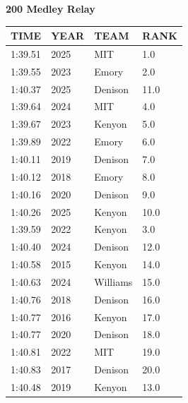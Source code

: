 \begin{table}[H]
\centering
\begin{minipage}[t]{0.6\textwidth}
\centering
\textbf{200 Medley Relay}\\[0.1cm]
\begin{tabular}{@{}p{1.8cm}p{1.2cm}p{1.4cm}p{0.8cm}@{}}
\hline
    \textbf{TIME} & \textbf{YEAR} & \textbf{TEAM} & \textbf{RANK} \\
\hline
    1:39.51 & 2025 & MIT & 1.0 \\
    1:39.55 & 2023 & Emory & 2.0 \\
    1:40.37 & 2025 & Denison & 11.0 \\
    1:39.64 & 2024 & MIT & 4.0 \\
    1:39.67 & 2023 & Kenyon & 5.0 \\
    1:39.89 & 2022 & Emory & 6.0 \\
    1:40.11 & 2019 & Denison & 7.0 \\
    1:40.12 & 2018 & Emory & 8.0 \\
    1:40.16 & 2020 & Denison & 9.0 \\
    1:40.26 & 2025 & Kenyon & 10.0 \\
    1:39.59 & 2022 & Kenyon & 3.0 \\
    1:40.40 & 2024 & Denison & 12.0 \\
    1:40.58 & 2015 & Kenyon & 14.0 \\
    1:40.63 & 2024 & Williams & 15.0 \\
    1:40.76 & 2018 & Denison & 16.0 \\
    1:40.77 & 2016 & Kenyon & 17.0 \\
    1:40.77 & 2020 & Denison & 18.0 \\
    1:40.81 & 2022 & MIT & 19.0 \\
    1:40.83 & 2017 & Denison & 20.0 \\
    1:40.48 & 2019 & Kenyon & 13.0 \\
\hline
\end{tabular}
\end{minipage}
\end{table}

